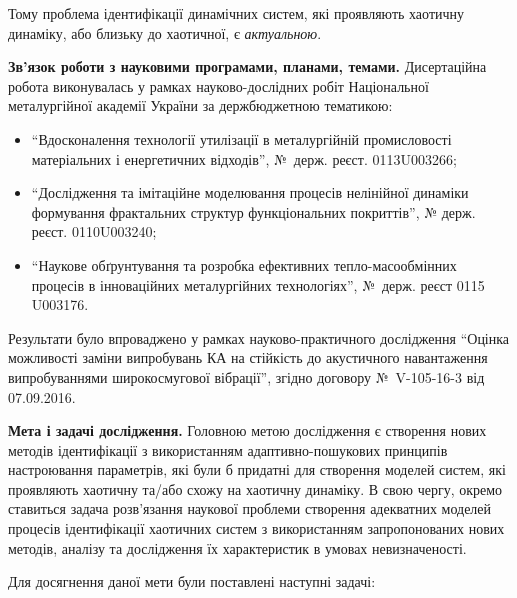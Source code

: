 \documentclass[a4paper,13pt]{atuaref}
\begin{document}
Тому проблема ідентифікації динамічних систем, які проявляють хаотичну
динаміку, або близьку до хаотичної, є
\textit{актуальною}.

\smallskip
\textbf{Зв'язок роботи з науковими програмами, планами, темами.}
Дисертаційна робота виконувалась у рамках науково-дослідних робіт
Національної металургійної академії України за держбюджетною
тематикою:

\begin{itemize}


\item
  ``Вдосконалення технології утилізації в металургійній промисловості
  матеріальних і енергетичних відходів'', №~держ. реєст. 0113U003266;

  \item
  ``Дослідження та імітаційне моделювання процесів нелінійної динаміки
  формування фрактальних структур функціональних   покриттів'',
  № держ. реєст. 0110U003240;

  \item
  ``Наукове обґрунтування та розробка ефективних тепло-масообмінних
  процесів в інноваційних металургійних технологіях'', №~держ. реєст 0115 U003176.

\end{itemize}

Результати було впроваджено у рамках науково-практичного дослідження
``Оцінка    можливості заміни випробувань КА на стійкість до акустичного навантаження
випробуваннями широкосмугової вібрації'', згідно договору №~V-105-16-3 від 07.09.2016.

\textbf{Мета і задачі дослідження.}
Головною метою дослідження є створення нових методів ідентифікації з
використанням адаптивно-пошукових принципів настроювання параметрів, які
були б придатні для створення моделей систем, які проявляють хаотичну
та/або схожу на хаотичну динаміку. В свою чергу, окремо ставиться задача
розв'язання наукової проблеми створення адекватних моделей процесів
ідентифікації хаотичних систем з використанням запропонованих нових
методів, аналізу та дослідження їх характеристик в умовах невизначеності.

Для досягнення даної мети були поставлені наступні задачі:
\end{document}
